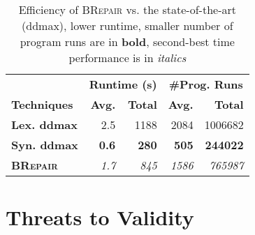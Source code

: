 \documentclass[sigconf,review,anonymous]{acmart}
\newenvironment{result}{\begin{framed}\centering\it}{\end{framed}}
\newcommand{\approach}{\textsc{BRepair}\xspace}
\begin{document}
\begin{table}[!tbp]\centering
\caption{Efficiency of \approach vs. the state-of-the-art (ddmax), lower runtime, smaller number of program runs %
are in \textbf{bold}, second-best time performance is in \textit{italics}}
\begin{tabular}{|l |  r  r | r  r |}
\hline
&  \multicolumn{2}{c|}{\textbf{Runtime (s)}} & \multicolumn{2}{c|}{\textbf{\#Prog. Runs}}  \\
\textbf{Techniques} %
&  \textbf{Avg.}  & \textbf{Total} & \textbf{Avg.}  & \textbf{Total} \\
\hline
\textbf{Lex. ddmax} & %
2.5 & 1188 & 2084 & 1006682 \\
\textbf{Syn. ddmax} & %
\textbf{0.6} & \textbf{280}  & \textbf{505}  & \textbf{244022}  \\
\hline
\textbf{\approach} &  %
\textit{1.7} & \textit{845}  & \textit{1586} & \textit{765987}  \\
\hline
\end{tabular}
\label{tab:efficiency}
\end{table}




%
%
%
%
%
%
%
%
%




\section{Threats to Validity}
\label{sec:threats}
\end{document}
